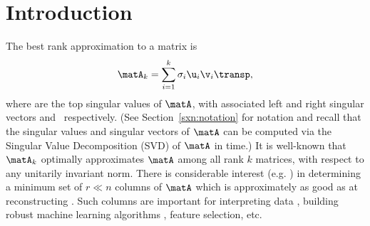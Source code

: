 \section{Introduction}

The best rank  approximation to a matrix
 is
$$\matA_k=\sum_{i=1}^k\sigma_i\u_i\v_i\transp,$$ where
 are the top 
 singular values of $\matA$, with associated left and right singular vectors
 and~ respectively. (See Section~\ref{sxn:notation} for notation and recall that the singular values and singular vectors of $\matA$ can be computed via the Singular Value Decomposition (SVD) of $\matA$ in  time.) It is well-known that $\matA_k$ optimally approximates $\matA$ among all rank $k$ matrices, with respect to any unitarily invariant norm.  There is considerable interest (e.g. \cite{CH92,DR10,DV06,DRVW06,DKR02,FKV98,HMT,LWMRT07,MD09}) in determining a minimum set of $r \ll n$ columns of $\matA$  which is approximately as good as  at reconstructing \math{\matA}.
Such columns are important for interpreting data \cite{MD09}, building robust machine learning algorithms \cite{CH92}, feature selection, etc.

